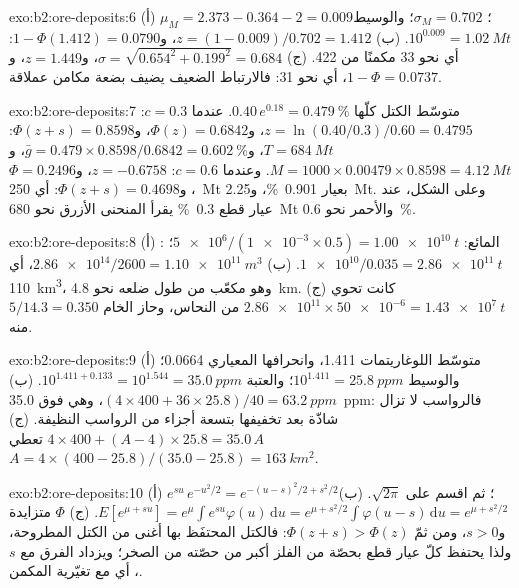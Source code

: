 \begin{solution}{exo:b2:ore-deposits:6}
(أ) $\mu_M = 2.373 - 0.364 - 2 = 0.009$؛ $\sigma_M = 0.702$؛ والوسيط $10^{0.009} = \qty{1.02}{Mt}$.
(ب) $z = (1 - 0.009)/0.702 = 1.412$، و$1 - \Phi(1.412) = 0.0790$: أي نحو 33 مكمنًا من 422.
(ج) $\sigma = \sqrt{0.654^2 + 0.199^2} = 0.684$، و$z = 1.449$، و$1 - \Phi = 0.0737$، أي نحو 31: فالارتباط
الضعيف يضيف بضعة مكامن عملاقة.
\end{solution}

\begin{solution}{exo:b2:ore-deposits:7}
متوسّط الكتل كلّها $0.40\,e^{0.18} = \qty{0.479}{\percent}$. عندما $c = 0.3$: $z = \ln(0.40/0.3)/0.60 =
0.4795$، و$\Phi(z) = 0.6842$، و$\Phi(z + s) = 0.8598$: $T = \qty{684}{Mt}$، و$\bar g = 0.479 \times
0.8598/0.6842 = \qty{0.602}{\percent}$، و$M = 1000 \times 0.00479 \times 0.8598 = \qty{4.12}{Mt}$.
وعندما $c = 0.6$: $z = -0.6758$، و$\Phi = 0.2496$، و$\Phi(z + s) = 0.4698$: أي \qty{250}{Mt} بعيار
\qty{0.901}{\percent}، و\qty{2.25}{Mt}. وعلى الشكل، عند عيار قطع \qty{0.3}{\percent} يقرأ المنحنى
الأزرق نحو \qty{680}{Mt} والأحمر نحو \qty{0.6}{\percent}.
\end{solution}

\begin{solution}{exo:b2:ore-deposits:8}
(أ) المائع: $\num{5e6}/(\num{1e-3} \times 0.5) = \qty{1.00e10}{t}$؛ : $\num{1e10}/0.035 =
\qty{2.86e11}{t}$. (ب) $\num{2.86e14}/2600 = \qty{1.10e11}{m^3}$، أي \qty{110}{km^3}، وهو مكعّب من 
طول ضلعه نحو \qty{4.8}{km}. (ج) كانت  تحوي $\num{2.86e11}
\times \num{50e-6} = \qty{1.43e7}{t}$ من النحاس، وحاز الخام $5/14.3 = 0.350$ منه.
\end{solution}

\begin{solution}{exo:b2:ore-deposits:9}
(أ) متوسّط اللوغاريتمات 1.411، وانحرافها المعياري 0.0664؛ والوسيط $10^{1.411} = \qty{25.8}{ppm}$؛
والعتبة $10^{1.411 + 0.133} = 10^{1.544} = \qty{35.0}{ppm}$. (ب) $(4 \times 400 + 36 \times 25.8)/40 =
\qty{63.2}{ppm}$، وهي فوق \qty{35.0}{ppm}: فالرواسب لا تزال شاذّة بعد تخفيفها بتسعة أجزاء من الرواسب
النظيفة. (ج) $4 \times 400 + (A - 4) \times 25.8 = 35.0\,A$ تعطي $A = 4 \times (400 -
25.8)/(35.0 - 25.8) = \qty{163}{km^2}$.
\end{solution}

\begin{solution}{exo:b2:ore-deposits:10}
(أ) $e^{su}\,e^{-u^2/2} = e^{-(u - s)^2/2 + s^2/2}$؛ ثم اقسم على $\sqrt{2\pi}$. (ب) $E[e^{\mu + su}] =
e^{\mu}\int e^{su}\varphi(u)\,\mathrm{d}u = e^{\mu + s^2/2}\int\varphi(u - s)\,\mathrm{d}u = e^{\mu +
s^2/2}$. (ج) $\Phi$ متزايدة و$s > 0$، ومن ثمّ $\Phi(z + s) > \Phi(z)$: فالكتل المحتفَظ بها أغنى من
الكتل المطروحة، ولذا يحتفظ كلّ عيار قطع بحصّة من الفلز أكبر من حصّته من الصخر؛ ويزداد
الفرق مع $s$، أي مع تغيّرية المكمن.
\end{solution}

